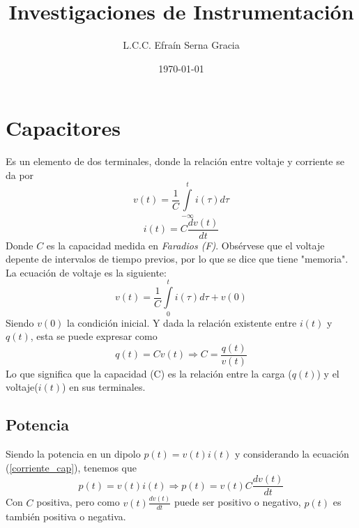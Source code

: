 \documentclass[12pt,spanish,lettersize]{article}
\title{\color{Maroon}Investigaciones de Instrumentaci\'on}
\author{L.C.C. Efra\'in Serna Gracia}
\date{\color{gray}\today}
\begin{document}
\maketitle
\section{Capacitores}
Es un elemento de dos terminales, donde la relaci\'on entre voltaje y corriente se da por \\
\begin{equation}
v(t) = \frac{1}{C}\int\limits_{-\infty}^{t}i(\tau)d\tau
\end{equation}
\begin{equation}\label{corriente_cap}
i(t) = C\frac{dv(t)}{dt}
\end{equation}
Donde $C$ es la capacidad medida en \emph{Faradios (F)}. Obs\'ervese que el voltaje depente de intervalos de tiempo previos, por lo que se dice que tiene "memoria".\\
La ecuaci\'on  de voltaje es la siguiente:
\begin{equation}
v(t) = \frac{1}{C}\int\limits_{0}^{t}i(\tau)d\tau + v(0)
\end{equation}
Siendo $v(0)$ la condici\'on inicial. Y dada la relaci\'on existente entre $i(t)$ y $q(t)$, esta se puede expresar como
\begin{equation}
q(t)=Cv(t) \Rightarrow C = \frac{q(t)}{v(t)}
\end{equation}
Lo que significa que la capacidad (C) es la relaci\'on entre la carga ($q(t)$) y el voltaje($i(t)$) en sus terminales.
\subsection{Potencia}
Siendo la potencia en un dipolo $p(t) = v(t)i(t)$ y considerando la ecuaci\'on (\ref{corriente_cap}), tenemos que
\begin{equation}\label{eq_pow}
p(t)=v(t)i(t) \Rightarrow p(t)=v(t)C\frac{dv(t)}{dt}
\end{equation}
Con $C$ positiva, pero como $v(t)\frac{dv(t)}{dt}$ puede ser positivo o negativo, $p(t)$ es tambi\'en positiva o negativa.
\end{document}

